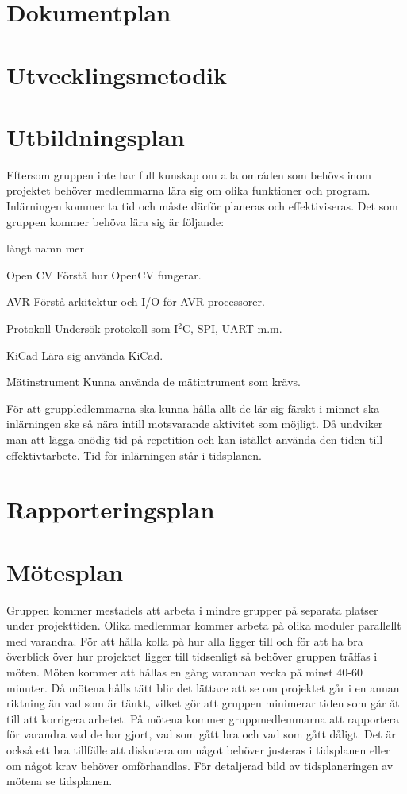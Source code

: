 \documentclass[projektplan/plan.tex]{subfiles}
\begin{document}
\section{Dokumentplan}

\section{Utvecklingsmetodik} 

\section{Utbildningsplan}
Eftersom gruppen inte har full kunskap om alla områden som behövs inom projektet behöver medlemmarna lära sig om olika funktioner och program. Inlärningen kommer ta tid och måste därför planeras och effektiviseras. Det som gruppen kommer behöva lära sig är följande:

\begin{labeling}{långt namn mer}
    \item[Open CV] Förstå hur OpenCV fungerar.
    \item[AVR] Förstå arkitektur och I/O för
    AVR-processorer.
    \item[Protokoll] Undersök protokoll som
    I$^2$C, SPI, UART m.m.
    \item[KiCad] Lära sig använda KiCad.
    \item[Mätinstrument] Kunna använda de mätintrument som krävs.
\end{labeling}

För att gruppledlemmarna ska kunna hålla allt de lär sig färskt i minnet ska inlärningen ske så nära intill motsvarande aktivitet som möjligt. Då undviker man att lägga onödig tid på repetition och kan istället använda den tiden till effektivtarbete. Tid för inlärningen står i tidsplanen.

\section{Rapporteringsplan}
\section{Mötesplan}
Gruppen kommer mestadels att arbeta i mindre grupper på separata platser under projekttiden. Olika medlemmar kommer arbeta på olika moduler parallellt med varandra. För att hålla kolla på hur alla ligger till och för att ha bra överblick över hur projektet ligger till tidsenligt så behöver gruppen träffas i möten. Möten kommer att hållas en gång varannan vecka på minst 40-60 minuter. Då mötena hålls tätt blir det lättare att se om projektet går i en annan riktning än vad som är tänkt, vilket gör att gruppen minimerar tiden som går åt till att korrigera arbetet. På mötena kommer gruppmedlemmarna att rapportera för varandra vad de har gjort, vad som gått bra och vad som gått dåligt. Det är också ett bra tillfälle att diskutera om något behöver justeras i tidsplanen eller om något krav behöver omförhandlas. För detaljerad bild av tidsplaneringen av mötena se tidsplanen.
\end{document}
